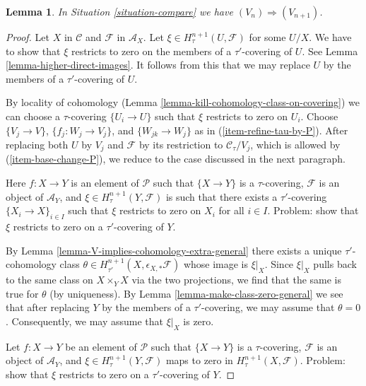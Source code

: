 \documentclass[10pt,a4paper]{amsart}
\theoremstyle{plain}
\newtheorem{lemma}[subsection]{Lemma}
\theoremstyle{definition}
\theoremstyle{remark}
\numberwithin{equation}{subsection}
\begin{document}
\begin{lemma}
\label{lemma-induction-step-V-C-general}
In Situation \ref{situation-compare} we have $(V_n) \Rightarrow (V_{n + 1})$.
\end{lemma}

\begin{proof}
Let $X$ in $\mathcal{C}$ and $\mathcal{F}$ in $\mathcal{A}_X$.
Let $\xi \in H^{n + 1}_\tau(U, \mathcal{F})$ for some $U/X$.
We have to show that $\xi$ restricts to zero on the members of
a $\tau'$-covering of $U$. See
Lemma \ref{lemma-higher-direct-images}.
It follows from this that we may
replace $U$ by the members of a $\tau'$-covering of $U$.

\medskip\noindent
By locality of cohomology
(Lemma \ref{lemma-kill-cohomology-class-on-covering})
we can choose a $\tau$-covering $\{U_i \to U\}$
such that $\xi$ restricts to zero on $U_i$.
Choose $\{V_j \to V\}$, $\{f_j : W_j \to V_j\}$, and
$\{W_{jk} \to W_j\}$ as in (\ref{item-refine-tau-by-P}).
After replacing both $U$ by $V_j$
and $\mathcal{F}$ by its restriction to
$\mathcal{C}_\tau/V_j$, which is allowed by
(\ref{item-base-change-P}), we reduce to the
case discussed in the next paragraph.

\medskip\noindent
Here $f : X \to Y$ is an element of $\mathcal{P}$
such that $\{X \to Y\}$ is a $\tau$-covering,
$\mathcal{F}$ is an object of $\mathcal{A}_Y$, and
$\xi \in H^{n + 1}_\tau(Y, \mathcal{F})$ is such that
there exists a $\tau'$-covering $\{X_i \to X\}_{i \in I}$
such that $\xi$ restricts to zero on $X_i$ for all $i \in I$.
Problem: show that $\xi$ restricts to zero on a $\tau'$-covering of $Y$.

\medskip\noindent
By Lemma \ref{lemma-V-implies-cohomology-extra-general} there exists a
unique $\tau'$-cohomology class
$\theta \in H^{n + 1}_{\tau'}(X, \epsilon_{X, *}\mathcal{F})$
whose image is $\xi|_X$.
Since $\xi|_X$ pulls back to the same class on $X \times_Y X$
via the two projections, we find that the same is true for $\theta$
(by uniqueness).
By Lemma \ref{lemma-make-class-zero-general}
we see that after replacing $Y$ by the members of a $\tau'$-covering,
we may assume that $\theta = 0$.
Consequently, we may assume that $\xi|_X$ is zero.

\medskip\noindent
Let $f : X \to Y$ be an element of $\mathcal{P}$
such that $\{X \to Y\}$ is a $\tau$-covering,
$\mathcal{F}$ is an object of $\mathcal{A}_Y$, and
$\xi \in H^{n + 1}_\tau(Y, \mathcal{F})$
maps to zero in $H^{n + 1}_\tau(X, \mathcal{F})$.
Problem: show that $\xi$ restricts to zero on a $\tau'$-covering of $Y$.


\end{proof}
\end{document}
